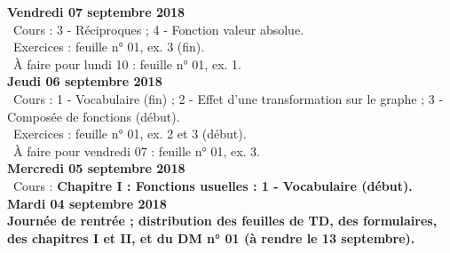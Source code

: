 \documentclass[12pt,a4paper]{article}
\begin{document}
\noindent\textbf{Vendredi 07 septembre 2018}\\
\bu\ Cours : 3 - Réciproques ; 4 - Fonction valeur absolue.\\
\bu\ Exercices : feuille n° 01, ex. 3 (fin).\\
\bu\ À faire pour lundi 10 : feuille n° 01, ex. 1.\vspace{.4cm}\\

\noindent\textbf{\bf Jeudi 06 septembre 2018}\\
\bu\ Cours : 1 - Vocabulaire (fin) ; 2 - Effet d'une transformation sur le graphe ; 3 - Composée de fonctions (début).\\
\bu\ Exercices : feuille n° 01, ex. 2 et 3 (début).\\
\bu\ À faire pour vendredi 07 : feuille n° 01, ex. 3.\vspace{.4cm}\\
    
\noindent\textbf{\bf Mercredi 05 septembre 2018}\\
\bu\ Cours : \bf Chapitre I \rm : Fonctions usuelles : 1 - Vocabulaire (début).\vspace{.4cm}\\
 
\noindent\textbf{\bf Mardi 04 septembre 2018}\\
Journée de rentrée ; distribution des feuilles de TD, des formulaires, des
chapitres I et II, et du DM n° 01 (à rendre le 13 septembre).\vspace{.4cm}\\


\label{end}
\end{document}
